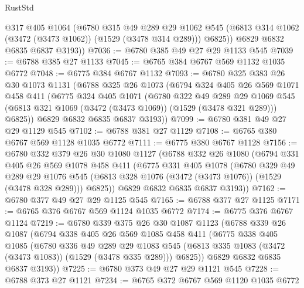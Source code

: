 \begin{lexlean}{RustStd}
\begin{coremodule}
          @317
          @405
          @1064
          (@6780
            @315
            @49
            @289
            @29
            @1062
            @545
            (@6813 @314 @1062 (@3472 (@3473 @1062)) (@1529 (@3478 @314 @289)))
            @6825))
        @6829
        @6832
        @6835
        @6837
        @3193))
@7036 := @6780 @385 @49 @27 @29 @1133 @545
@7039 := @6788 @385 @27 @1133
@7045 := @6765 @384 @6767 @569 @1132 @1035 @6772
@7048 := @6775 @384 @6767 @1132
@7093 := @6780
    @325
    @383
    @26
    @30
    @1073
    @1131
    (@6788
      @325
      @26
      @1073
      (@6794
        @324
        @405
        @26
        @569
        @1071
        @458
        @411
        (@6775
          @324
          @405
          @1071
          (@6780
            @322
            @49
            @289
            @29
            @1069
            @545
            (@6813 @321 @1069 (@3472 (@3473 @1069)) (@1529 (@3478 @321 @289)))
            @6825))
        @6829
        @6832
        @6835
        @6837
        @3193))
@7099 := @6780 @381 @49 @27 @29 @1129 @545
@7102 := @6788 @381 @27 @1129
@7108 := @6765 @380 @6767 @569 @1128 @1035 @6772
@7111 := @6775 @380 @6767 @1128
@7156 := @6780
    @332
    @379
    @26
    @30
    @1080
    @1127
    (@6788
      @332
      @26
      @1080
      (@6794
        @331
        @405
        @26
        @569
        @1078
        @458
        @411
        (@6775
          @331
          @405
          @1078
          (@6780
            @329
            @49
            @289
            @29
            @1076
            @545
            (@6813 @328 @1076 (@3472 (@3473 @1076)) (@1529 (@3478 @328 @289)))
            @6825))
        @6829
        @6832
        @6835
        @6837
        @3193))
@7162 := @6780 @377 @49 @27 @29 @1125 @545
@7165 := @6788 @377 @27 @1125
@7171 := @6765 @376 @6767 @569 @1124 @1035 @6772
@7174 := @6775 @376 @6767 @1124
@7219 := @6780
    @339
    @375
    @26
    @30
    @1087
    @1123
    (@6788
      @339
      @26
      @1087
      (@6794
        @338
        @405
        @26
        @569
        @1085
        @458
        @411
        (@6775
          @338
          @405
          @1085
          (@6780
            @336
            @49
            @289
            @29
            @1083
            @545
            (@6813 @335 @1083 (@3472 (@3473 @1083)) (@1529 (@3478 @335 @289)))
            @6825))
        @6829
        @6832
        @6835
        @6837
        @3193))
@7225 := @6780 @373 @49 @27 @29 @1121 @545
@7228 := @6788 @373 @27 @1121
@7234 := @6765 @372 @6767 @569 @1120 @1035 @6772

\end{coremodule}
\end{lexlean}

